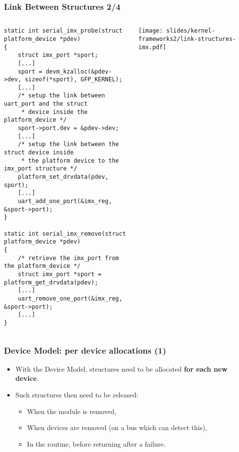 \begin{frame}[fragile]
  \frametitle{Link Between Structures 2/4}
  \begin{columns}
    \begin{verbatim}
static int serial_imx_probe(struct platform_device *pdev)
{
    struct imx_port *sport;
    [...]
    sport = devm_kzalloc(&pdev->dev, sizeof(*sport), GFP_KERNEL);
    [...]
    /* setup the link between uart_port and the struct
     * device inside the platform_device */
    sport->port.dev = &pdev->dev;
    [...]
    /* setup the link between the struct device inside
     * the platform device to the imx_port structure */
    platform_set_drvdata(pdev, sport);
    [...]
    uart_add_one_port(&imx_reg, &sport->port);
}

static int serial_imx_remove(struct platform_device *pdev)
{
    /* retrieve the imx_port from the platform_device */
    struct imx_port *sport = platform_get_drvdata(pdev);
    [...]
    uart_remove_one_port(&imx_reg, &sport->port);
    [...]
}
    \end{verbatim}
    \begin{center}
      \texttt{[image: slides/kernel-frameworks2/link-structures-imx.pdf]}
    \end{center}
  \end{columns}
\end{frame}

\begin{frame}
  \frametitle{Device Model: per device allocations (1)}
  \begin{itemize}
  \item With the Device Model, structures need to be allocated
  {\bf for each new device}.
  \item Such structures then need to be released:
  \begin{itemize}
	\item When the module is removed,
	\item When devices are removed (on a bus
 	      which can detect this),
	\item In the  routine, before
	      returning after a failure.
  \end{itemize}
  \end{itemize}
\end{frame}

